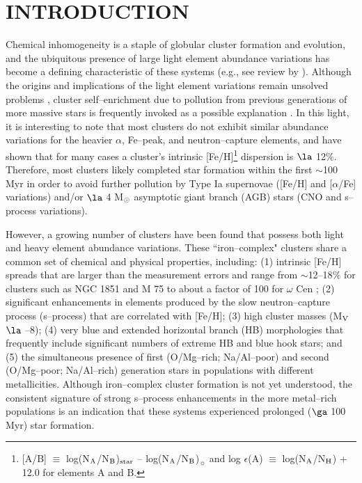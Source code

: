 \documentclass[12pt,preprint]{emulateapj}
\begin{document}

\section{INTRODUCTION}

Chemical inhomogeneity is a staple of globular cluster formation and evolution,
and the ubiquitous presence of large light element abundance variations has
become a defining characteristic of these systems (e.g., see review by 
\citealt{Gratton12a}).  Although the origins and implications of the light 
element variations remain unsolved problems \citep[e.g.,][]{Bastian15,
Renzini15}, cluster self--enrichment due to pollution from previous generations 
of more massive stars is frequently invoked as a possible explanation 
\citep[e.g.,][]{Decressin07,deMink09,Bastian13,Denissenkov15,D'Antona16}.  In 
this light, it is interesting to note that most clusters do not exhibit similar
abundance variations for the heavier $\alpha$, Fe--peak, and neutron--capture 
elements, and \citet{Carretta09a} have shown that for many cases a cluster's 
intrinsic [Fe/H]\footnote{[A/B] $\equiv$ log(N$_{\rm A}$/N$_{\rm B}$)$_{\rm star}$ -- log(N$_{\rm A}$/N$_{\rm B}$)$_{\sun}$ and log $\epsilon$(A) $\equiv$
log(N$_{\rm A}$/N$_{\rm H}$) + 12.0 for elements A and B.} dispersion is $\la$
12$\%$.  Therefore, most clusters likely completed star formation within the 
first $\sim$100 Myr in order to avoid further pollution by Type Ia supernovae 
([Fe/H] and [$\alpha$/Fe] variations) and/or $\la$ 4 M$_{\rm \odot}$ asymptotic
giant branch (AGB) stars (CNO and s--process variations).

However, a growing number of clusters have been found that possess both light
and heavy element abundance variations.  These ``iron--complex" clusters
share a common set of chemical and physical properties, including: (1) 
intrinsic [Fe/H] spreads that are larger than the measurement errors and 
range from $\sim$12--18$\%$ for clusters such as NGC 1851 and M 75 
\citep[e.g.,][]{Carretta11,Kacharov13} to about a factor of 100 for $\omega$ 
Cen \citep[e.g.,][]{Johnson10,Marino11a}; (2) significant enhancements in 
elements produced by the slow neutron--capture process (s--process) that are 
correlated with [Fe/H]; (3) high cluster masses (M$_{\rm V}$ $\la$ --8); 
(4) very blue and extended horizontal branch (HB) morphologies that frequently 
include significant numbers of extreme HB and blue hook stars; and (5) the 
simultaneous presence of first (O/Mg--rich; Na/Al--poor) and second 
(O/Mg--poor; Na/Al--rich) generation stars in populations with different 
metallicities.  Although iron--complex cluster formation is not yet understood,
the consistent signature of strong s--process enhancements in the more 
metal--rich populations is an indication that these systems experienced 
prolonged ($\ga$ 100 Myr) star formation.  
\end{document}
